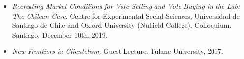 \begin{itemize}
	\item \emph{Recreating Market Conditions for Vote-Selling and Vote-Buying in the Lab: The Chilean Case}. Centre for Experimental Social Sciences, Universidad de Santiago de Chile and Oxford University (Nuffield College). Colloquium. Santiago, December 10th, 2019.
	\item \emph{New Frontiers in Clientelism}. Guest Lecture. Tulane University, 2017.
\end{itemize}
